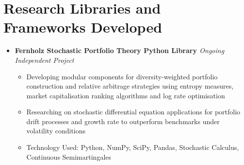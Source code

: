 \documentclass[a4paper,9pt]{article}
\newcommand{\resumeProject}[4]{
    \item\small{
        \textbf{#1} \hfill \textit{#2}\\
        \textit{#3}\\
        \begin{itemize}[leftmargin=1.5em,label=\textbullet,nosep,itemsep=0.5pt]
            #4
        \end{itemize}
    }\vspace{2pt}
}
\newcommand{\compactSection}[2]{
    \section{#1}
    \vspace{-0.1cm}
    #2
    \vspace{-0.2cm}
}
\begin{document}
\newpage

\compactSection{Research Libraries and Frameworks Developed}{
\begin{itemize}[leftmargin=*,label={},itemsep=4pt]
    \resumeProject{Fernholz Stochastic Portfolio Theory Python Library \href{https://github.com/XAheli/Fernholz-SPT}{\faGithub}}{Ongoing}
    {Independent Project}
    {\item Developing modular components for diversity-weighted portfolio construction and relative arbitrage strategies using entropy measures, market capitalisation ranking algorithms and log rate optimisation
    \item Researching on stochastic differential equation applications for portfolio drift processes and growth rate to outperform benchmarks under volatility conditions
    \item Technology Used: Python, NumPy, SciPy, Pandas, Stochastic Calculus, Continuous Semimartingales}
     
\end{itemize}
}
\end{document}

